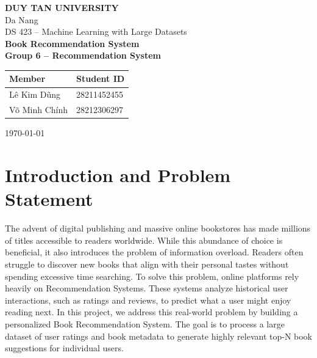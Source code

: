 \documentclass[12pt]{article}
\begin{document}
\begin{titlepage}
\centering
\vspace*{1cm}
{\Large \textbf{DUY TAN UNIVERSITY}}\\[0.3cm]
{\large Da Nang}\\[1.5cm]
{\large DS 423 -- Machine Learning with Large Datasets}\\[2.5cm]
{\huge \textbf{Book Recommendation System}}\\[1cm]
{\large \textbf{Group 6 -- Recommendation System}}\\[1.5cm]
\begin{tabular}{ll}
\textbf{Member} & \textbf{Student ID} \\
\hline
Lê Kim Dũng & 28211452455 \\
Võ Minh Chính & 28212306297 \\
\end{tabular}
\vfill
{\large \today}
\end{titlepage}

\tableofcontents
\newpage

\begin{abstract}
This project develops a Book Recommendation System using the Goodbooks-10k dataset to assist readers in discovering books tailored to their preferences. The sheer volume of published books makes it challenging for users to find relevant reading material without intelligent assistance. We implemented a hybrid approach combining Collaborative Filtering via Singular Value Decomposition (SVD) and Content-Based Filtering using TF-IDF and Cosine Similarity on book metadata (authors and tags). The Collaborative Filtering model achieved an RMSE of 0.8402 and an MAE of 0.6566, with a Precision@10 of 0.6639 and Recall@10 of 0.7101. Our unified recommendation function successfully outputs a personalized top-10 reading list for users, demonstrating the effectiveness of matrix factorization techniques on sparse rating datasets.
\end{abstract}

\section{Introduction and Problem Statement}
The advent of digital publishing and massive online bookstores has made millions of titles accessible to readers worldwide. While this abundance of choice is beneficial, it also introduces the problem of information overload. Readers often struggle to discover new books that align with their personal tastes without spending excessive time searching. To solve this problem, online platforms rely heavily on Recommendation Systems. These systems analyze historical user interactions, such as ratings and reviews, to predict what a user might enjoy reading next. In this project, we address this real-world problem by building a personalized Book Recommendation System. The goal is to process a large dataset of user ratings and book metadata to generate highly relevant top-N book suggestions for individual users.
\end{document}
